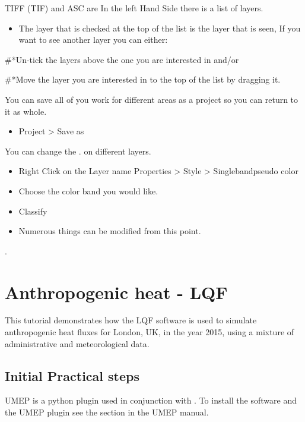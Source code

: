 \documentclass[letterpaper,10pt,english]{sphinxmanual}
\begin{document}
TIFF (TIF) and ASC are  In the left Hand
Side there is a list of layers.
\begin{itemize}
\item {} 
The layer that is checked at the top of the list is the layer that is
seen, If you want to see another layer you can either:

\end{itemize}

\#*Un-tick the layers above the one you are interested in and/or

\#*Move the layer you are interested in to the top of the list by
dragging it.

You can save all of you work for different areas as a project \textendash{} so you
can return to it as whole.
\begin{itemize}
\item {} 
Project \textgreater{} Save as

\end{itemize}

You can change the . on different layers.
\begin{itemize}
\item {} 
Right Click on the Layer name Properties \textgreater{} Style \textgreater{} Singlebandpseudo
color

\item {} 
Choose the color band you would like.

\item {} 
Classify

\item {} 
Numerous things can be modified from this point.

\end{itemize}

.


\section{Anthropogenic heat - LQF}
\label{\detokenize{Tutorials/LQF:anthropogenic-heat-lqf}}\label{\detokenize{Tutorials/LQF:lqf}}\label{\detokenize{Tutorials/LQF::doc}}
This tutorial demonstrates how the LQF software is used to simulate
anthropogenic heat fluxes for London, UK, in the year 2015, using a
mixture of administrative and meteorological data.


\subsection{Initial Practical steps}
\label{\detokenize{Tutorials/LQF:initial-practical-steps}}
UMEP is a python plugin used in conjunction with
. To install the software and the UMEP
plugin see the {\hyperref[\detokenize{Getting_Started:getting-started}]{}}
section in the UMEP manual.
\end{document}
